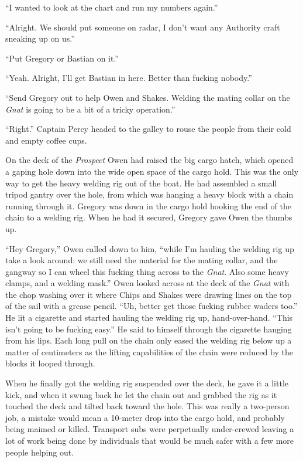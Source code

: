 \documentclass[]{scrbook}
\begin{document}
``I wanted to look at the chart and run my numbers again.''

``Alright. We should put someone on radar, I don't want any Authority
craft sneaking up on us.''

``Put Gregory or Bastian on it.''

``Yeah. Alright, I'll get Bastian in here. Better than fucking nobody.''

``Send Gregory out to help Owen and Shakes. Welding the mating collar on
the \emph{Gnat} is going to be a bit of a tricky operation.''

``Right.'' Captain Percy headed to the galley to rouse the people from
their cold and empty coffee cups.

On the deck of the \emph{Prospect} Owen had raised the big cargo hatch,
which opened a gaping hole down into the wide open space of the cargo
hold. This was the only way to get the heavy welding rig out of the
boat. He had assembled a small tripod gantry over the hole, from which
was hanging a heavy block with a chain running through it. Gregory was
down in the cargo hold hooking the end of the chain to a welding rig.
When he had it secured, Gregory gave Owen the thumbs up.

``Hey Gregory,'' Owen called down to him, ``while I'm hauling the
welding rig up take a look around: we still need the material for the
mating collar, and the gangway so I can wheel this fucking thing across
to the \emph{Gnat}. Also some heavy clamps, and a welding mask.'' Owen
looked across at the deck of the \emph{Gnat} with the chop washing over
it where Chips and Shakes were drawing lines on the top of the sail with
a grease pencil. ``Uh, better get those fucking rubber waders too.'' He
lit a cigarette and started hauling the welding rig up, hand-over-hand.
``This isn't going to be fucking easy.'' He said to himself through the
cigarette hanging from his lips. Each long pull on the chain only eased
the welding rig below up a matter of centimeters as the lifting
capabilities of the chain were reduced by the blocks it looped through.

When he finally got the welding rig suspended over the deck, he gave it
a little kick, and when it swung back he let the chain out and grabbed
the rig as it touched the deck and tilted back toward the hole. This was
really a two-person job, a mistake would mean a 10-meter drop into the
cargo hold, and probably being maimed or killed. Transport subs were
perpetually under-crewed leaving a lot of work being done by individuals
that would be much safer with a few more people helping out.
\end{document}
